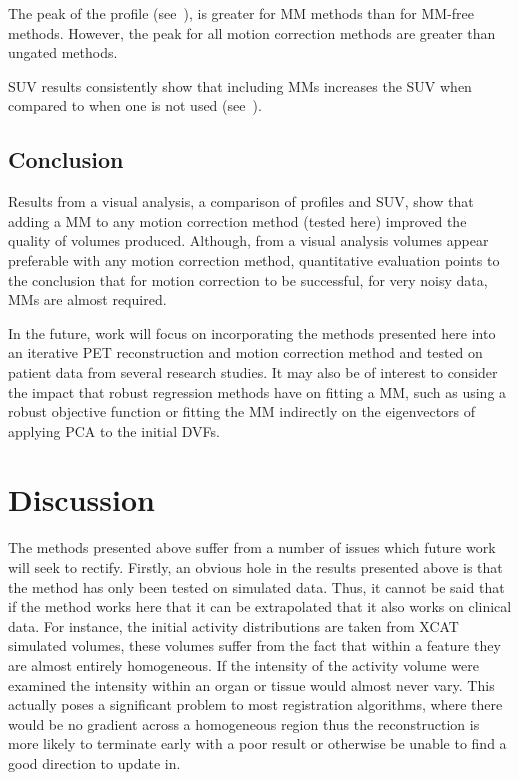             The peak of the profile (see~), is greater for \gls{MM} methods than for \gls{MM}-free methods. However, the peak for all motion correction methods are greater than ungated methods.
             
            \gls{SUV} results consistently show that including \glspl{MM} increases the \gls{SUV} when compared to when one is not used (see~).
        
        \subsection{Conclusion} \label{sec:comparison_of_motion_correction_methods_incorporating_motion_modelling_for_pet_ct_using_a_single_breath_hold_attenuation_map_conclusions}
            Results from a visual analysis, a comparison of profiles and \gls{SUV}, show that adding a \gls{MM} to any motion correction method (tested here) improved the quality of volumes produced. Although, from a visual analysis volumes appear preferable with any motion correction method, quantitative evaluation points to the conclusion that for motion correction to be successful, for very noisy data, \glspl{MM} are almost required.
            
            In the future, work will focus on incorporating the methods presented here into an iterative \gls{PET} reconstruction and motion correction method and tested on patient data from several research studies. It may also be of interest to consider the impact that robust regression methods have on fitting a \gls{MM}, such as using a robust objective function or fitting the \gls{MM} indirectly on the eigenvectors of applying \gls{PCA} to the initial \glspl{DVF}.
    
    \section{Discussion} \label{sec:initial_motion_correction_using_basic_reconstruction_and_gating_methods_with_less_challenging_data_discussion}
        The methods presented above suffer from a number of issues which future work will seek to rectify. Firstly, an obvious hole in the results presented above is that the method has only been tested on simulated data. Thus, it cannot be said that if the method works here that it can be extrapolated that it also works on clinical data. For instance, the initial activity distributions are taken from \gls{XCAT} simulated volumes, these volumes suffer from the fact that within a feature they are almost entirely homogeneous. If the intensity of the activity volume were examined the intensity within an organ or tissue would almost never vary. This actually poses a significant problem to most registration algorithms, where there would be no gradient across a homogeneous region thus the reconstruction is more likely to terminate early with a poor result or otherwise be unable to find a good direction to update in.
        
